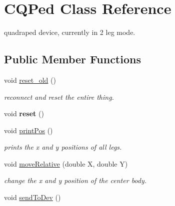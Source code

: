 \hypertarget{class_c_q_ped}{
\section{CQPed Class Reference}
\label{class_c_q_ped}
}


quadraped device, currently in 2 leg mode.  


\subsection*{Public Member Functions}
\begin{DoxyCompactItemize}
\item 
void \hyperlink{class_c_q_ped_abc32ad0b6668da1eed281a0ef943eb8b}{reset\_\-old} ()
\begin{DoxyCompactList}\small\item\em reconnect and reset the entire thing. \item\end{DoxyCompactList}\item 
\hypertarget{class_c_q_ped_a93038e7ebe45982833d8250dfc64fc11}{
void {\bfseries reset} ()}
\label{class_c_q_ped_a93038e7ebe45982833d8250dfc64fc11}

\item 
\hypertarget{class_c_q_ped_af3a3e9af02572add33090c02648da08a}{
void \hyperlink{class_c_q_ped_af3a3e9af02572add33090c02648da08a}{printPos} ()}
\label{class_c_q_ped_af3a3e9af02572add33090c02648da08a}

\begin{DoxyCompactList}\small\item\em prints the x and y positions of all legs. \item\end{DoxyCompactList}\item 
\hypertarget{class_c_q_ped_adfdd083aee142c9c27f7aeb7c5bae0aa}{
void \hyperlink{class_c_q_ped_adfdd083aee142c9c27f7aeb7c5bae0aa}{moveRelative} (double X, double Y)}
\label{class_c_q_ped_adfdd083aee142c9c27f7aeb7c5bae0aa}

\begin{DoxyCompactList}\small\item\em change the x and y position of the center body. \item\end{DoxyCompactList}\item 
\hypertarget{class_c_q_ped_acb8649785d6f4ec1c6f15735a9e8977f}{
void \hyperlink{class_c_q_ped_acb8649785d6f4ec1c6f15735a9e8977f}{sendToDev} ()}
\label{class_c_q_ped_acb8649785d6f4ec1c6f15735a9e8977f}


\end{DoxyCompactItemize}
